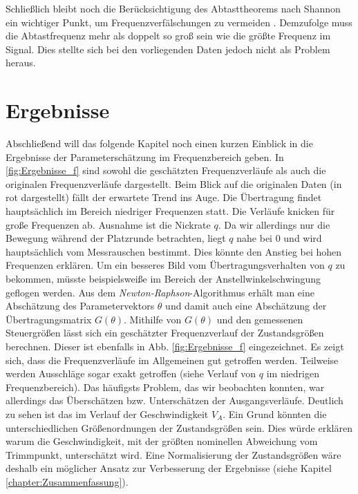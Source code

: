 Schließlich bleibt noch die Berücksichtigung des Abtasttheorems nach Shannon ein wichtiger Punkt, um Frequenzverfälschungen 
zu vermeiden \cite{Grimm2017}. Demzufolge muss die Abtastfrequenz mehr als doppelt so groß sein wie die größte Frequenz im 
Signal. Dies stellte sich bei den vorliegenden Daten jedoch nicht als Problem heraus.

\section{Ergebnisse}

Abschließend will das folgende Kapitel noch einen kurzen 
Einblick in die Ergebnisse der Parameterschätzung im Frequenzbereich geben. In \cref{fig:Ergebnisse_f} sind sowohl die 
geschätzten Frequenzverläufe als auch die originalen Frequenzverläufe dargestellt. Beim Blick auf die originalen Daten (in 
rot dargestellt) fällt der erwartete Trend ins Auge. Die Übertragung findet hauptsächlich im Bereich niedriger Frequenzen 
statt. Die Verläufe knicken für große Frequenzen ab. Ausnahme ist die Nickrate $q$. Da wir allerdings nur die Bewegung 
während der Platzrunde betrachten, liegt $q$ nahe bei $ 0 $ und wird hauptsächlich vom Messrauschen bestimmt. Dies könnte den 
Anstieg bei hohen Frequenzen erklären. Um ein besseres Bild vom Übertragungsverhalten von $q$ zu bekommen, müsste 
beispielsweiße im Bereich der Anstellwinkelschwingung geflogen werden. Aus dem \textit{Newton-Raphson}-Algorithmus erhält man 
eine Abschätzung des Parametervektors $\theta$ und damit auch eine Abschätzung der Übertragungsmatrix $G(\theta)$. Mithilfe 
von $G(\theta)$ und den gemessenen Steuergrößen lässt sich ein geschätzter Frequenzverlauf der Zustandsgrößen berechnen. 
Dieser ist ebenfalls in Abb. \ref{fig:Ergebnisse_f} eingezeichnet. Es zeigt sich, dass die Frequenzverläufe im Allgemeinen 
gut getroffen werden. Teilweise werden Ausschläge sogar exakt getroffen (siehe Verlauf von $q$ im niedrigen Frequenzbereich). 
Das häufigsts Problem, das wir beobachten konnten, war allerdings das Überschätzen bzw. Unterschätzen der Ausgangsverläufe. 
Deutlich zu sehen ist das im Verlauf der Geschwindigkeit $V_{A}$. Ein Grund könnten die unterschiedlichen Größenordnungen der 
Zustandsgrößen sein. Dies würde erklären warum die Geschwindigkeit, mit der größten nominellen Abweichung vom Trimmpunkt, 
unterschätzt wird. Eine Normalisierung der Zustandsgrößen wäre deshalb ein möglicher Ansatz zur Verbesserung der Ergebnisse 
(siehe Kapitel \ref{chapter:Zusammenfassung}). 

